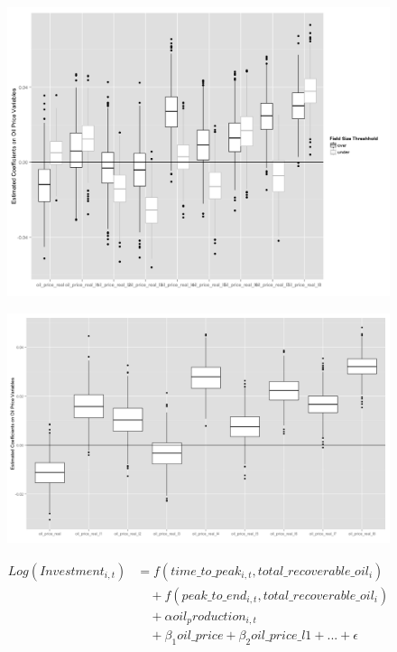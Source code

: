 \documentclass{beamer}
\begin{document}
\begin{frame}[plain]
	\begin{figure}
	\includegraphics[width=.8\textwidth]{figures/gam_price_8_pres.png}
	\label{gam_price_8}
	\end{figure}
\end{frame}

\begin{frame}[plain]
	\begin{figure}
	\includegraphics[width=1\textwidth]{figures/gam_price_pooled_print.png}
	\label{gam_price_pooled}
	\end{figure}
\end{frame}

\begin{frame}[plain]
	\begin{equation}
	\begin{split}
		Log(Investment_{i,t})&=f(time\_to\_peak_{i,t}, total\_recoverable\_oil_i) \\
		& \quad + f(peak\_to\_end_{i,t}, total\_recoverable\_oil_i) \\
		& \quad + \alpha oil_production_{i,t} \\
		& \quad + \beta_1 oil\_price + \beta_2 oil\_price\_l1 + ... +  \epsilon
	\end{split}
	\label{gam_invest_eqn}
	\end{equation}
\end{frame}
\end{document}
